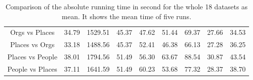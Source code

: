 \begin{table}[]
{\begin{tabular}{@{}ccccccccc@{}}
			Orgs vs Places        & 34.79 & 1529.51 & 45.37    & 47.62          & 51.44 & 69.37  & 27.66 & 34.53 \\
			Places vs Orgs        & 33.18 & 1488.56 & 45.37    & 52.41          & 46.38 & 66.13  & 27.28 & 36.25 \\
			Places vs People      & 38.01 & 1794.56 & 51.49    & 56.30          & 63.67 & 88.54  & 30.87 & 43.54 \\
			People vs Places      & 37.11 & 1641.59 & 51.49    & 60.23          & 53.68 & 77.32  & 28.37 & 38.70 \\ \bottomrule
	\end{tabular}}
	\caption[Time comparison of whole dataset]{Comparison of the absolute running time in second for the whole 18 datasets as mean. It shows the mean time of five runs.\label{BTableCompleteTime}}
\end{table}
